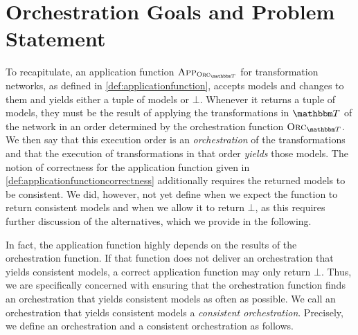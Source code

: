 \section{Orchestration Goals and Problem Statement} %

To recapitulate, an application function $\appfunction{\orcfunction{\transformationset{T}}}$ for transformation networks, as defined in \autoref{def:applicationfunction}, accepts models and changes to them and yields either a tuple of models or $\bot$.
Whenever it returns a tuple of models, they must be the result of applying the transformations in $\transformationset{T}$ of the network in an order determined by the orchestration function $\orcfunction{\transformationset{T}}$.
We then say that this execution order is an \emph{orchestration} of the transformations and that the execution of transformations in that order \emph{yields} those models.
The notion of correctness for the application function given in \autoref{def:applicationfunctioncorrectness} additionally requires the returned models to be consistent.
We did, however, not yet define when we expect the function to return consistent models and when we allow it to return $\bot$, as this requires further discussion of the alternatives, which we provide in the following.

In fact, the application function highly depends on the results of the orchestration function.
If that function does not deliver an orchestration that yields consistent models, a correct application function may only return $\bot$.
Thus, we are specifically concerned with ensuring that the orchestration function finds an orchestration that yields consistent models as often as possible.
We call an orchestration that yields consistent models a \emph{consistent orchestration}.
Precisely, we define an orchestration and a consistent orchestration as follows.

